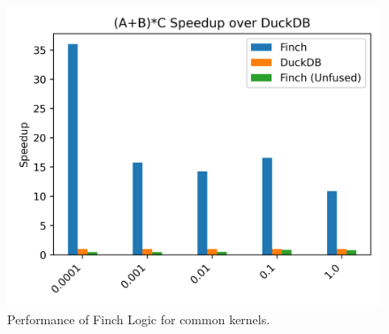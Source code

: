 \begin{figure}
\begin{minipage}[t]{0.32\linewidth}
    \vspace{0pt}
  \end{minipage}%
  \begin{minipage}[t]{0.36\linewidth}
    \vspace{0pt}
    \centering
    \includegraphics[width=\linewidth]{figures/elementwise_speedup_over_duckdb.png}
    \vspace{0pt}
  \end{minipage}

  \vspace{-24pt}
  \caption{Performance of Finch Logic for common kernels.}
  \label{fig:fusion}
\end{figure}





